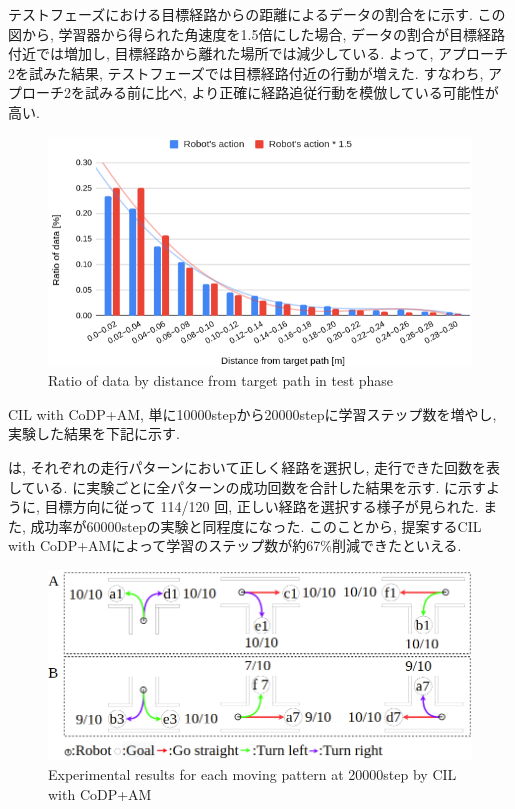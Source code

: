 
  テストフェーズにおける目標経路からの距離によるデータの割合をに示す. この図から, 学習器から得られた角速度を1.5倍にした場合, データの割合が目標経路付近では増加し, 目標経路から離れた場所では減少している. よって, アプローチ2を試みた結果, テストフェーズでは目標経路付近の行動が増えた. すなわち, アプローチ2を試みる前に比べ, より正確に経路追従行動を模倣している可能性が高い.

  \begin{figure}[hbtp]
    \centering
   \includegraphics[keepaspectratio, scale=0.37]
        {images/hist_act_test2.png}
   \caption{Ratio of data by distance from target path in test phase}
   \label{Fig:hist_act_test}
  \end{figure}  



CIL with CoDP+AM, 単に10000stepから20000stepに学習ステップ数を増やし, 実験した結果を下記に示す.

は, それぞれの走行パターンにおいて正しく経路を選択し, 走行できた回数を表している.  に実験ごとに全パターンの成功回数を合計した結果を示す.  に示すように, 目標方向に従って 114/120 回, 正しい経路を選択する様子が見られた. また, 成功率が60000stepの実験と同程度になった. このことから, 提案するCIL with CoDP+AMによって学習のステップ数が約67\%削減できたといえる.

\begin{figure}[hbtp]
  \centering
 \includegraphics[keepaspectratio, scale=0.42]
      {images/20000step_act1.5.png}
 \caption{Experimental results for each moving pattern at 20000step by CIL with CoDP+AM}
 \label{Fig:20000step_act1.5}
\end{figure} 

